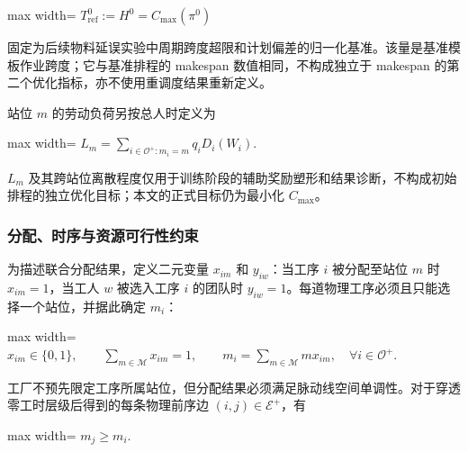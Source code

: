 \documentclass[journal,10pt]{IEEEtran}
\begin{document}
\begin{center}
\begin{adjustbox}{max width=\columnwidth}
$\displaystyle
T_{\mathrm{ref}}^0:=H^0=C_{\max}(\pi^0)
$
\end{adjustbox}
\end{center}

固定为后续物料延误实验中周期跨度超限和计划偏差的归一化基准。该量是基准模板作业跨度；它与基准排程的 makespan 数值相同，不构成独立于 makespan 的第二个优化指标，亦不使用重调度结果重新定义。

站位 \(m\) 的劳动负荷另按总人时定义为

\begin{center}
\begin{adjustbox}{max width=\columnwidth}
$\displaystyle
L_m=\sum_{i\in\mathcal{O}^{+}:m_i=m}q_iD_i(W_i).
$
\end{adjustbox}
\end{center}

\(L_m\) 及其跨站位离散程度仅用于训练阶段的辅助奖励塑形和结果诊断，不构成初始排程的独立优化目标；本文的正式目标仍为最小化 \(C_{\max}\)。

\subsubsection{分配、时序与资源可行性约束}\label{ux5206ux914dux65f6ux5e8fux4e0eux8d44ux6e90ux53efux884cux6027ux7ea6ux675f}

为描述联合分配结果，定义二元变量 \(x_{im}\) 和 \(y_{iw}\)：当工序 \(i\) 被分配至站位 \(m\) 时 \(x_{im}=1\)，当工人 \(w\) 被选入工序 \(i\) 的团队时 \(y_{iw}=1\)。每道物理工序必须且只能选择一个站位，并据此确定 \(m_i\)：

\begin{center}
\begin{adjustbox}{max width=\columnwidth}
$\displaystyle
x_{im}\in\{0,1\},\qquad
\sum_{m\in\mathcal{M}}x_{im}=1,\qquad
m_i=\sum_{m\in\mathcal{M}}m x_{im},
\quad \forall i\in\mathcal{O}^{+}.
$
\end{adjustbox}
\end{center}

工厂不预先限定工序所属站位，但分配结果必须满足脉动线空间单调性。对于穿透零工时层级后得到的每条物理前序边 \((i,j)\in\mathcal E^+\)，有

\begin{center}
\begin{adjustbox}{max width=\columnwidth}
$\displaystyle
m_j\ge m_i.
$
\end{adjustbox}
\end{center}
\end{document}
